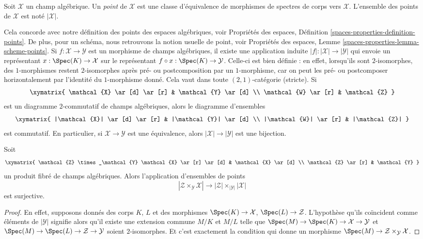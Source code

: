 \begin{definition}
\label{definition-points}
Soit $\mathcal{X}$ un champ algébrique.
Un {\it point} de $\mathcal{X}$ est une classe d'équivalence de morphismes
de spectres de corps vers $\mathcal{X}$.
L'ensemble des points de $\mathcal{X}$ est noté $|\mathcal{X}|$.
\end{definition}

\noindent
Cela concorde avec notre définition des points des espaces algébriques, voir
Propriétés des espaces, Définition \ref{spaces-properties-definition-points}.
De plus, pour un schéma, nous retrouvons la notion usuelle de point, voir
Propriétés des espaces, Lemme \ref{spaces-properties-lemma-scheme-points}.
Si $f : \mathcal{X} \to \mathcal{Y}$ est un morphisme de champs algébriques,
il existe une application induite $|f| : |\mathcal{X}| \to |\mathcal{Y}|$ qui
envoie un représentant $x : \Spec(K) \to \mathcal{X}$ sur le
représentant $f \circ x : \Spec(K) \to \mathcal{Y}$. Celle-ci est
bien définie : en effet, lorsqu'ils sont $2$-isomorphes, des $1$-morphismes restent $2$-isomorphes après
pré- ou postcomposition par un $1$-morphisme, car on peut les pré- ou postcomposer horizontalement
par l'identité du $1$-morphisme donné. Cela vaut
dans toute $(2, 1)$-catégorie (stricte). Si
$$
\xymatrix{
\mathcal{X} \ar[d] \ar[r] & \mathcal{Y} \ar[d] \\
\mathcal{W} \ar[r] & \mathcal{Z}
}
$$
est un diagramme $2$-commutatif de champs algébriques, alors le diagramme
d'ensembles
$$
\xymatrix{
|\mathcal{X}| \ar[d] \ar[r] & |\mathcal{Y}| \ar[d] \\
|\mathcal{W}| \ar[r] & |\mathcal{Z}|
}
$$
est commutatif.
En particulier, si $\mathcal{X} \to \mathcal{Y}$ est une équivalence,
alors $|\mathcal{X}| \to |\mathcal{Y}|$ est une bijection.

\begin{lemma}
\label{lemma-points-cartesian}
Soit
$$
\xymatrix{
\mathcal{Z} \times_\mathcal{Y} \mathcal{X} \ar[r] \ar[d] &
\mathcal{X} \ar[d] \\
\mathcal{Z} \ar[r] & \mathcal{Y}
}
$$
un produit fibré de champs algébriques. Alors l'application d'ensembles
de points
$$
|\mathcal{Z} \times_\mathcal{Y} \mathcal{X}|
\longrightarrow
|\mathcal{Z}| \times_{|\mathcal{Y}|} |\mathcal{X}|
$$
est surjective.
\end{lemma}

\begin{proof}
En effet, supposons donnés des corps $K$, $L$ et des morphismes
$\Spec(K) \to \mathcal{X}$, $\Spec(L) \to \mathcal{Z}$.
L'hypothèse qu'ils coïncident comme éléments de $|\mathcal{Y}|$ signifie alors
qu'il existe une extension commune $M/K$ et $M/L$
telle que
$\Spec(M) \to \Spec(K) \to \mathcal{X} \to \mathcal{Y}$ et
$\Spec(M) \to \Spec(L) \to \mathcal{Z} \to \mathcal{Y}$
soient $2$-isomorphes. Et c'est exactement la condition qui donne un
morphisme $\Spec(M) \to \mathcal{Z} \times_\mathcal{Y} \mathcal{X}$.
\end{proof}


